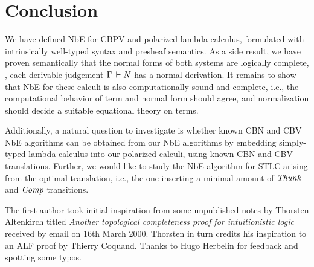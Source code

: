 \documentclass[sigplan,screen,fleqn,review]{acmart} %
\begin{document}
\section{Conclusion}
\label{sec:concl}

We have defined NbE for CBPV and polarized lambda calculus,
formulated with intrinsically well-typed syntax and presheaf
semantics.  As a side result, we have proven semantically
that the normal forms of both systems are logically complete, \ie,
each derivable judgement $\Gamma \,\vdash N$ has a normal derivation.
It remains to show that NbE for these calculi is also computationally
sound and complete, i.e., the computational behavior of term and
normal form should agree, and normalization should decide a suitable
equational theory on terms.

Additionally, a natural question to investigate is whether known CBN
and CBV NbE algorithms can be obtained from our NbE algorithms by
embedding simply-typed lambda calculus into our polarized calculi,
using known CBN and CBV translations.  Further, we would like to study
the NbE algorithm for STLC arising from the optimal translation, i.e.,
the one inserting a minimal amount of $\mathit{Thunk}$ and $\mathit{Comp}$ transitions.


\begin{acks}
The first author took initial inspiration from some
  unpublished notes by Thorsten Altenkirch titled
\emph{Another topological completeness proof for intuitionistic logic}
received by email on 16th March 2000.
Thorsten in turn credits his inspiration to an ALF proof by Thierry
Coquand.  Thanks to Hugo Herbelin for feedback and spotting some typos.
\end{acks}




\end{document}
